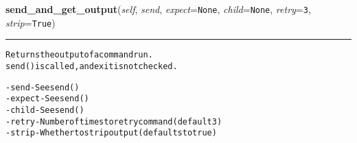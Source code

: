     \label{shutit_global:ShutIt:send_and_get_output}

    \vspace{0.5ex}

\hspace{.8\funcindent}\begin{boxedminipage}{\funcwidth}

    \raggedright \textbf{send\_and\_get\_output}(\textit{self}, \textit{send}, \textit{expect}={\tt None}, \textit{child}={\tt None}, \textit{retry}={\tt 3}, \textit{strip}={\tt True})

    \vspace{-1.5ex}

    \rule{\textwidth}{0.5\fboxrule}
\setlength{\parskip}{2ex}
\begin{alltt}
Returns the output of a command run.
    send() is called, and exit is not checked.

- send   - See send()
- expect - See send()
- child  - See send()
- retry  - Number of times to retry command (default 3)
- strip  - Whether to strip output (defaults to true)
    
\end{alltt}

\setlength{\parskip}{1ex}
    \end{boxedminipage}

    \label{shutit_global:ShutIt:install}

    \vspace{0.5ex}


